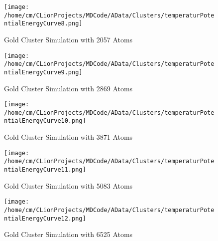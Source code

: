 \begin{figure}[!h] 
    \begin{center} 
        \texttt{[image: /home/cm/CLionProjects/MDCode/AData/Clusters/temperaturPotentialEnergyCurve8.png]} 
    \end{center} 
    \caption[Gold Cluster Simulation with 2057 Atoms]{Gold Cluster Simulation with 2057 Atoms} 
    \label{GoldClusterSimulationTemperaturEnergy2057} 
\end{figure} 
 
\begin{figure}[!h] 
    \begin{center} 
        \texttt{[image: /home/cm/CLionProjects/MDCode/AData/Clusters/temperaturPotentialEnergyCurve9.png]} 
    \end{center} 
    \caption[Gold Cluster Simulation with 2869 Atoms]{Gold Cluster Simulation with 2869 Atoms} 
    \label{GoldClusterSimulationTemperaturEnergy2869} 
\end{figure} 
 
\begin{figure}[!h] 
    \begin{center} 
        \texttt{[image: /home/cm/CLionProjects/MDCode/AData/Clusters/temperaturPotentialEnergyCurve10.png]} 
    \end{center} 
    \caption[Gold Cluster Simulation with 3871 Atoms]{Gold Cluster Simulation with 3871 Atoms} 
    \label{GoldClusterSimulationTemperaturEnergy3871} 
\end{figure} 
 
\begin{figure}[!h] 
    \begin{center} 
        \texttt{[image: /home/cm/CLionProjects/MDCode/AData/Clusters/temperaturPotentialEnergyCurve11.png]} 
    \end{center} 
    \caption[Gold Cluster Simulation with 5083 Atoms]{Gold Cluster Simulation with 5083 Atoms} 
    \label{GoldClusterSimulationTemperaturEnergy5083} 
\end{figure} 
 
\begin{figure}[!h] 
    \begin{center} 
        \texttt{[image: /home/cm/CLionProjects/MDCode/AData/Clusters/temperaturPotentialEnergyCurve12.png]} 
    \end{center} 
    \caption[Gold Cluster Simulation with 6525 Atoms]{Gold Cluster Simulation with 6525 Atoms} 
    \label{GoldClusterSimulationTemperaturEnergy6525} 
\end{figure} 
 
